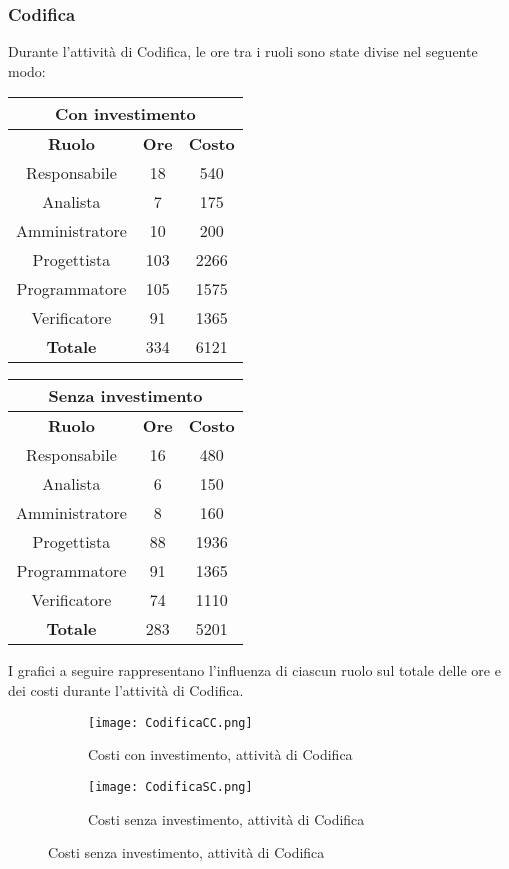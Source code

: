 \documentclass{scalatekids-article}
\begin{document}
\subsubsection{Codifica}
Durante l'attività di Codifica, le ore tra i ruoli sono state divise nel seguente modo:
\begin{center}
  \normalsize
  \begin{tabular}{| c | c | c |}
    \hline
    \multicolumn{3}{|c|}{\textbf{Con investimento}}\\
    \hline
    \textbf{Ruolo} & \textbf{Ore} & \textbf{Costo}\\
    \hline
    Responsabile & 18 & 540 \\
    Analista & 7 & 175\\
    Amministratore & 10 & 200\\
    Progettista & 103 & 2266\\
    Programmatore & 105 & 1575\\
    Verificatore & 91 & 1365\\
    \hline
    \textbf{Totale} & 334 & 6121\\
    \hline
  \end{tabular}
  \qquad
  \begin{tabular}{| c | c | c |}
    \hline
    \multicolumn{3}{|c|}{\textbf{Senza investimento}}\\
    \hline
    \textbf{Ruolo} & \textbf{Ore} & \textbf{Costo}\\
    \hline
    Responsabile & 16 & 480\\
    Analista & 6 & 150\\
    Amministratore & 8 & 160\\
    Progettista & 88 & 1936\\
    Programmatore & 91 & 1365\\
    Verificatore & 74 & 1110\\
    \hline
    \textbf{Totale} & 283 & 5201\\
    \hline
  \end{tabular}
\end{center}
I grafici a seguire rappresentano l'influenza di ciascun ruolo sul totale delle ore e dei costi durante l'attività di Codifica.
\begin{figure}[H]
  \begin{subfigure}[H]{0.47\textwidth}
    \texttt{[image: CodificaCC.png]}
    \caption{Costi con investimento, attività di Codifica}
  \end{subfigure}
  \qquad
  \begin{subfigure}[H]{0.47\textwidth}
    \texttt{[image: CodificaSC.png]}
    \caption{Costi senza investimento, attività di Codifica}
  \end{subfigure}
\end{figure}
\newpage
\end{document}
